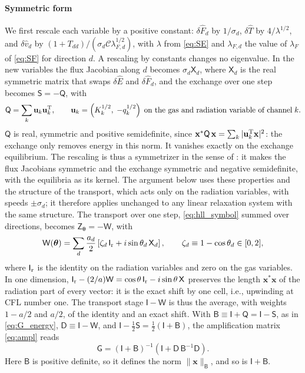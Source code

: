 \documentclass[preprint,12pt,authoryear]{elsarticle}
\newcommand{\tenS}{\mathsf{S}}
\newcommand{\tenI}{\mathsf{I}}
\newcommand{\tenG}{\mathsf{G}}
\newcommand{\tenZ}{\mathsf{Z}}
\providecommand{\tenD}{\mathsf{D}}
\providecommand{\tenB}{\mathsf{B}}
\providecommand{\tenQ}{\mathsf{Q}}
\providecommand{\tenW}{\mathsf{W}}
\providecommand{\tenX}{\mathsf{X}}
\newcommand{\hE}{\hat{E}}
\newcommand{\hv}{\hat{v}}
\newcommand{\hF}{\hat{F}}
\newcommand{\hT}{\hat{T}}
\newcommand{\calC}{\mathcal{C}}
\begin{document}
\begin{appendix}
\paragraph{Symmetric form} We first rescale each variable by a positive constant: $\delta\hF_d$ by $1/\sigma_d$, $\delta\hT$ by $4/\lambda^{1/2}$, and $\delta\hv_d$ by $(1 + T_{dd})/(\sigma_d\calC\lambda_{F,d}^{1/2})$, with $\lambda$ from \autoref{eq:SE} and $\lambda_{F,d}$ the value of $\lambda_F$ of \autoref{eq:SF} for direction $d$. A rescaling by constants changes no eigenvalue. In the new variables the flux Jacobian along $d$ becomes $\sigma_d\tenX_d$, where $\tenX_d$ is the real symmetric matrix that swaps $\delta\hE$ and $\delta\hF_d$, and the exchange over one step becomes $\tenS = -\tenQ$, with
\begin{equation}
    \tenQ = \sum_k \mathbf{u}_k\mathbf{u}_k^{\rm T},
    \qquad
    \mathbf{u}_k = \left(K_k^{1/2},\; -q_k^{1/2}\right) \;\mbox{on the gas and radiation variable of channel}\; k .
    \label{eq:Q_sym}
\end{equation}
$\tenQ$ is real, symmetric and positive semidefinite, since $\mathbf{x}^*\tenQ\,\mathbf{x} = \sum_k |\mathbf{u}_k^{\rm T}\mathbf{x}|^2$: the exchange only removes energy in this norm. It vanishes exactly on the exchange equilibrium. The rescaling is thus a symmetrizer in the sense of \citet{Yong99a}: it makes the flux Jacobians symmetric and the exchange symmetric and negative semidefinite, with the equilibria as its kernel. The argument below uses these properties and the structure of the transport, which acts only on the radiation variables, with speeds $\pm\sigma_d$; it therefore applies unchanged to any linear relaxation system with the same structure. The transport over one step, \autoref{eq:hll_symbol} summed over directions, becomes $\tenZ_{\boldsymbol{\theta}} = -\tenW$, with
\begin{equation}
    \tenW(\boldsymbol{\theta}) = \sum_d \frac{a_d}{2}\left[\zeta_d\,\tenI_{\rm r} + i\sin\theta_d\,\tenX_d\right],
    \qquad \zeta_d \equiv 1 - \cos\theta_d \in [0, 2],
    \label{eq:W_sym}
\end{equation}
where $\tenI_{\rm r}$ is the identity on the radiation variables and zero on the gas variables. In one dimension, $\tenI_{\rm r} - (2/a)\tenW = \cos\theta\,\tenI_{\rm r} - i\sin\theta\,\tenX$ preserves the length $\mathbf{x}^*\mathbf{x}$ of the radiation part of every vector: it is the exact shift by one cell, i.e., upwinding at CFL number one. The transport stage $\tenI - \tenW$ is thus the average, with weights $1 - a/2$ and $a/2$, of the identity and an exact shift. With $\tenB \equiv \tenI + \tenQ = \tenI - \tenS$, as in \autoref{eq:G_energy}, $\tenD \equiv \tenI - \tenW$, and $\tenI - \tfrac{1}{2}\tenS = \tfrac{1}{2}(\tenI + \tenB)$, the amplification matrix \autoref{eq:ampl} reads
\begin{equation}
    \tenG = \left(\tenI + \tenB\right)^{-1}\left(\tenI + \tenD\,\tenB^{-1}\tenD\right).
    \label{eq:G_sym}
\end{equation}
Here $\tenB$ is positive definite, so it defines the norm $\|\mathbf{x}\|_{\tenB}$, and so is $\tenI + \tenB$.


\end{appendix}
\end{document}
